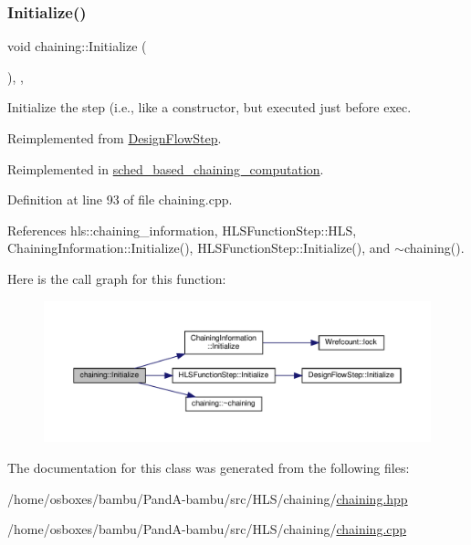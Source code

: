 \mbox{\label{classchaining_a2ec8eacb120c33974ba7829842910880}} 
\subsubsection{\texorpdfstring{Initialize()}{Initialize()}}
{\footnotesize\ttfamily void chaining\+::\+Initialize (\begin{DoxyParamCaption}{ }\end{DoxyParamCaption})\hspace{0.3cm}{\ttfamily [override]}, {\ttfamily [protected]}, {\ttfamily [virtual]}}



Initialize the step (i.\+e., like a constructor, but executed just before exec. 



Reimplemented from \hyperlink{classDesignFlowStep_a44b50683382a094976e1d432a7784799}{Design\+Flow\+Step}.



Reimplemented in \hyperlink{classsched__based__chaining__computation_a86daa9b72e0e2d9a939e80aa22055d4e}{sched\+\_\+based\+\_\+chaining\+\_\+computation}.



Definition at line 93 of file chaining.\+cpp.



References hls\+::chaining\+\_\+information, H\+L\+S\+Function\+Step\+::\+H\+LS, Chaining\+Information\+::\+Initialize(), H\+L\+S\+Function\+Step\+::\+Initialize(), and $\sim$chaining().

Here is the call graph for this function\+:
\nopagebreak
\begin{figure}[H]
\begin{center}
\leavevmode
\includegraphics[width=350pt]{d5/d13/classchaining_a2ec8eacb120c33974ba7829842910880_cgraph}
\end{center}
\end{figure}


The documentation for this class was generated from the following files\+:\begin{DoxyCompactItemize}
\item 
/home/osboxes/bambu/\+Pand\+A-\/bambu/src/\+H\+L\+S/chaining/\hyperlink{chaining_8hpp}{chaining.\+hpp}\item 
/home/osboxes/bambu/\+Pand\+A-\/bambu/src/\+H\+L\+S/chaining/\hyperlink{chaining_8cpp}{chaining.\+cpp}\end{DoxyCompactItemize}
